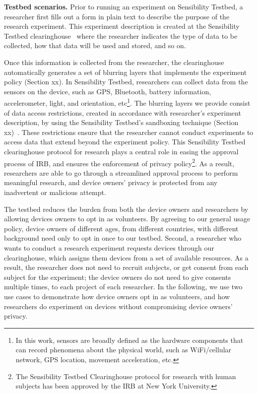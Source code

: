 \textbf{Testbed scenarios.}
Prior to running an experiment on Sensibility Testbed, a
researcher first fills out a form in plain text to describe the
purpose of the research experiment. This experiment description
is created at the Sensibility Testbed clearinghouse~\cite{ch}
where the researcher indicates the type of data to be collected,
how that data will be used and stored, and so on. 

Once this information is collected from the researcher, the
clearinghouse automatically generates a set of blurring layers
that implements the experiment policy (Section xx). In
Sensibility Testbed, researchers can collect data from the
sensors on the device, such as GPS, Bluetooth, battery
information, accelerometer, light, and orientation,
etc\footnote{In this work, sensors are broadly defined as the
hardware components that can record phenomena about the physical
world, such as WiFi/cellular network, GPS location, movement
acceleration, etc.}. The blurring layers we provide consist of
data access restrictions, created in accordance with
researcher's experiment description, by using the Sensibility
Testbed's sandboxing technique (Section
xx)~\cite{cappos2010retaining}. These restrictions ensure that
the researcher cannot conduct experiments to access data that
extend beyond the experiment policy. This Sensibility Testbed
clearinghouse protocol for research plays a central role in
easing the approval process of IRB, and ensures the enforcement
of privacy policy\footnote{The Sensibility Testbed Clearinghouse
protocol for research with human subjects has been approved by
the IRB at New York University. }. As a result, researchers
are able to go through a streamlined approval process to perform
meaningful research, and device owners' privacy is protected
from any inadvertent or malicious attempt.

The testbed reduces the burden from both the device owners and
researchers by allowing devices owners to opt in as volunteers.
By agreeing to our general usage policy, device owners of
different ages, from different countries, with different
background need only to opt in once to our testbed. Second, a
researcher who wants to conduct a research experiment requests
devices through our clearinghouse, which assigns them devices
from a set of available resources. As a result, the researcher
does not need to recruit subjects, or get consent from each
subject for the experiment; the device owners do not need to
give consents multiple times, to each project of each
researcher. In the following, we use two use cases to
demonstrate how device owners opt in as volunteers, and how
researchers do experiment on devices without compromising device
owners' privacy.

